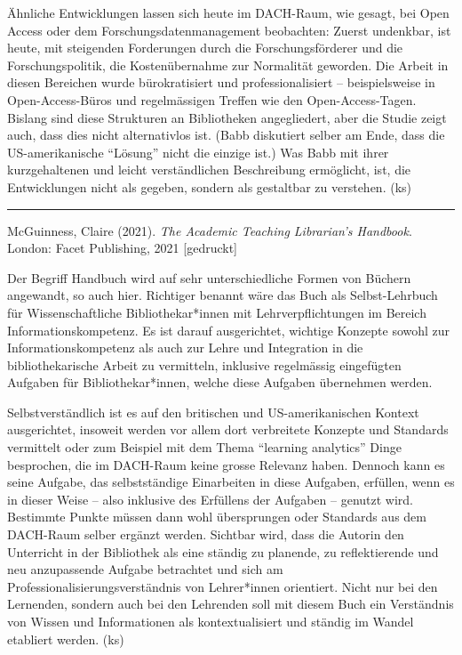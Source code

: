 \documentclass[a4paper,
fontsize=11pt,
oneside,
numbers=noperiodatend,
parskip=half-,
bibliography=totoc,
final
]{scrartcl}
\begin{document}
Ähnliche Entwicklungen lassen sich heute im DACH-Raum, wie gesagt, bei
Open Access oder dem Forschungsdatenmanagement beobachten: Zuerst
undenkbar, ist heute, mit steigenden Forderungen durch die
Forschungsförderer und die Forschungspolitik, die Kostenübernahme zur
Normalität geworden. Die Arbeit in diesen Bereichen wurde bürokratisiert
und professionalisiert -- beispielsweise in Open-Access-Büros und
regelmässigen Treffen wie den Open-Access-Tagen. Bislang sind diese
Strukturen an Bibliotheken angegliedert, aber die Studie zeigt auch,
dass dies nicht alternativlos ist. (Babb diskutiert selber am Ende, dass
die US-amerikanische \enquote{Lösung} nicht die einzige ist.) Was Babb
mit ihrer kurzgehaltenen und leicht verständlichen Beschreibung
ermöglicht, ist, die Entwicklungen nicht als gegeben, sondern als
gestaltbar zu verstehen. (ks)

\begin{center}\rule{0.5\linewidth}{0.5pt}\end{center}

McGuinness, Claire (2021). \emph{The Academic Teaching Librarian's
Handbook}. London: Facet Publishing, 2021 {[}gedruckt{]}

Der Begriff Handbuch wird auf sehr unterschiedliche Formen von Büchern
angewandt, so auch hier. Richtiger benannt wäre das Buch als
Selbst-Lehrbuch für Wissenschaftliche Bibliothekar*innen mit
Lehrverpflichtungen im Bereich Informationskompetenz. Es ist darauf
ausgerichtet, wichtige Konzepte sowohl zur Informationskompetenz als
auch zur Lehre und Integration in die bibliothekarische Arbeit zu
vermitteln, inklusive regelmässig eingefügten Aufgaben für
Bibliothekar*innen, welche diese Aufgaben übernehmen werden.

Selbstverständlich ist es auf den britischen und US-amerikanischen
Kontext ausgerichtet, insoweit werden vor allem dort verbreitete
Konzepte und Standards vermittelt oder zum Beispiel mit dem Thema
\enquote{learning analytics} Dinge besprochen, die im DACH-Raum keine
grosse Relevanz haben. Dennoch kann es seine Aufgabe, das selbstständige
Einarbeiten in diese Aufgaben, erfüllen, wenn es in dieser Weise -- also
inklusive des Erfüllens der Aufgaben -- genutzt wird. Bestimmte Punkte
müssen dann wohl übersprungen oder Standards aus dem DACH-Raum selber
ergänzt werden. Sichtbar wird, dass die Autorin den Unterricht in der
Bibliothek als eine ständig zu planende, zu reflektierende und neu
anzupassende Aufgabe betrachtet und sich am
Professionalisierungsverständnis von Lehrer*innen orientiert. Nicht nur
bei den Lernenden, sondern auch bei den Lehrenden soll mit diesem Buch
ein Verständnis von Wissen und Informationen als kontextualisiert und
ständig im Wandel etabliert werden. (ks)
\end{document}
